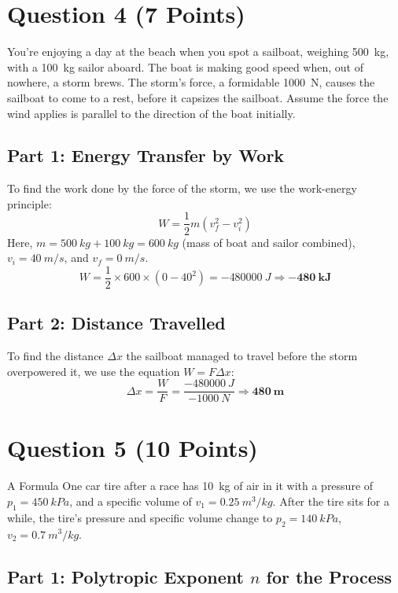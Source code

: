 \documentclass{article}
\begin{document}
\newpage
\section*{Question 4 (7 Points)}

You're enjoying a day at the beach when you spot a sailboat, weighing \SI{500}{kg}, with a \SI{100}{kg} sailor aboard. The boat is making good speed when, out of nowhere, a storm brews. The storm's force, a formidable \SI{1000}{N}, causes the sailboat to come to a rest, before it capsizes the sailboat. Assume the force the wind applies is parallel to the direction of the boat initially.

\subsection*{Part 1: Energy Transfer by Work}

To find the work done by the force of the storm, we use the work-energy principle:
\[
W = \frac{1}{2}m(v_f^2 - v_i^2)
\]
Here, \( m = \SI{500}{kg} + \SI{100}{kg} = \SI{600}{kg} \) (mass of boat and sailor combined), \( v_i = \SI{40}{m/s} \), and \( v_f = \SI{0}{m/s} \).
\[
W = \frac{1}{2} \times 600 \times (0 - 40^2) = -\SI{480000}{J} \Rightarrow \mathbf{-\SI{480}{kJ}}
\]

\subsection*{Part 2: Distance Travelled}

To find the distance \( \Delta x \) the sailboat managed to travel before the storm overpowered it, we use the equation \( W = F \Delta x \):
\[
\Delta x = \frac{W}{F} = \frac{-\SI{480000}{J}}{-\SI{1000}{N}} \Rightarrow \mathbf{\SI{480}{m}}
\]

\newpage
\section*{Question 5 (10 Points)}

A Formula One car tire after a race has \SI{10}{kg} of air in it with a pressure of \( p_1 = \SI{450}{kPa} \), and a specific volume of \( v_1 = \SI{0.25}{m^3/kg} \). After the tire sits for a while, the tire's pressure and specific volume change to \( p_2 = \SI{140}{kPa} \), \( v_2 = \SI{0.7}{m^3/kg} \).

\subsection*{Part 1: Polytropic Exponent \( n \) for the Process}
\end{document}
